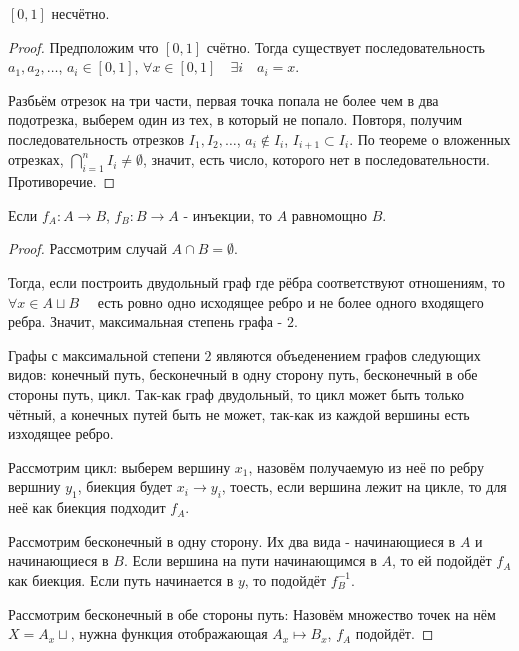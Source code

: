 \begin{theorem} \thmslashn

    $[0, 1]$ несчётно.

    \begin{proof} \thmslashn
    
        Предположим что $[0, 1]$ счётно. Тогда существует последовательность $a_1, a_2, \ldots$, $a_{i}\in [0, 1]$, $\forall{x\in [0, 1]}\quad \exists{i}\quad a_{i} = x$.

        Разбьём отрезок на три части, первая точка попала не более чем в два подотрезка, выберем один из тех, в который не попало. Повторя, получим последовательность отрезков $I_1, I_2, \ldots$, $a_{i} \not\in I_{i}$, $I_{i+1} \subset I_{i}$. По теореме о вложенных отрезках, $\bigcap_{i=1}^{n} I_{i} \neq \emptyset$, значит, есть число, которого нет в последовательности. Противоречие.
    \end{proof}
\end{theorem}
\begin{theorem} \thmslashn

    Если $f_{A} : A \to B$, $f_{B} : B \to A$ - инъекции, то $A$ равномощно $B$.
    \begin{proof} \thmslashn
    
        Рассмотрим случай $A\cap B = \emptyset$.

        Тогда, если построить двудольный граф где рёбра соответствуют отношениям, то $\forall{x\in A \sqcup B }\quad $ есть ровно одно исходящее ребро и не более одного входящего ребра. Значит, максимальная степень графа - $2$.

        Графы с максимальной степени $2$ являются объеденением графов следующих видов: конечный путь, бесконечный в одну сторону путь, бесконечный в обе стороны путь, цикл. Так-как граф двудольный, то цикл может быть только чётный, а конечных путей быть не может, так-как из каждой вершины есть изходящее ребро.

        Рассмотрим цикл: выберем вершину $x_1$, назовём получаемую из неё по ребру вершниу $y_{1}$, биекция будет $x_{i} \to y_{i}$, тоесть, если вершина лежит на цикле, то для неё как биекция подходит $f_{A}$.

        Рассмотрим бесконечный в одну сторону. Их два вида - начинающиеся в $A$ и начинающиеся в $B$. Если вершина на пути начинающимся в $A$, то ей подойдёт $f_{A}$ как биекция. Если путь начинается в $y$, то подойдёт $f_{B}^{-1}$.

        Рассмотрим бесконечный в обе стороны путь: Назовём множество точек на нём $X = A_{x} \sqcup$, нужна функция отображающая $A_{x} \mapsto B_{x}$, $f_{A}$ подойдёт.
    \end{proof}
\end{theorem}
